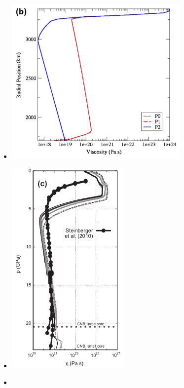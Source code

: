 \begin{itemize}
\item {}

\begin{center}
\includegraphics[width=9cm]{images/mars/viscosity/roar12}
\end{center}

\item {}

\begin{center}
\includegraphics[width=6cm]{images/mars/viscosity/ruts13}
\end{center}

\item {}


\end{itemize}

